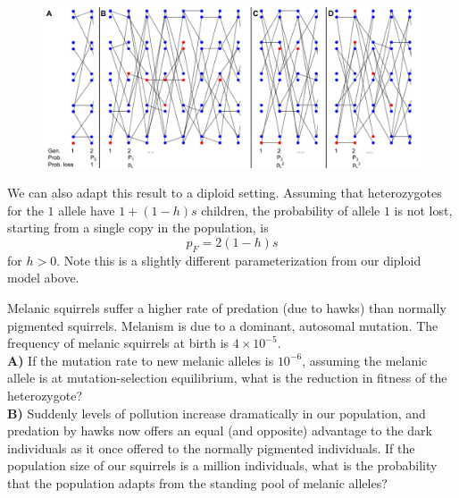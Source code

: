 \begin{figure}
\begin{center}
\includegraphics[width=\textwidth]{figures/Proof_of_pL_2s.png}
\end{center}
\caption{} \label{fig:Proof_of_pL_2s}
\end{figure}

We can also adapt this result to a diploid setting.
Assuming that heterozygotes for the $1$ allele have $1+(1-h)s$ children, the
probability of allele $1$ is not lost, starting from a single copy in
the population, is
\begin{equation}
p_F = 2 (1-h)s \label{eqn:diploid_escape}
\end{equation}
for $h>0$. Note this is a slightly different parameterization from
our diploid model above.\\


\begin{tcolorbox} 
\begin{question}
Melanic squirrels suffer a higher rate of predation (due to hawks) than normally pigmented squirrels. Melanism is due to a dominant, autosomal mutation. The frequency of melanic squirrels at birth is $4 \times 10^{-5}$.\\

{\bf A)} If the mutation rate to new melanic alleles is $10^{-6}$, assuming the melanic allele is at mutation-selection equilibrium, what is the reduction in fitness of the heterozygote? \\ 
{\bf B)} Suddenly levels of pollution increase dramatically in our population, and predation by hawks now offers an equal (and opposite) advantage to the dark individuals as it once offered to the normally pigmented individuals. If the population size of our squirrels is a million individuals, what is the probability that the population adapts from the standing pool of melanic alleles?  
\end{question}
\end{tcolorbox}

